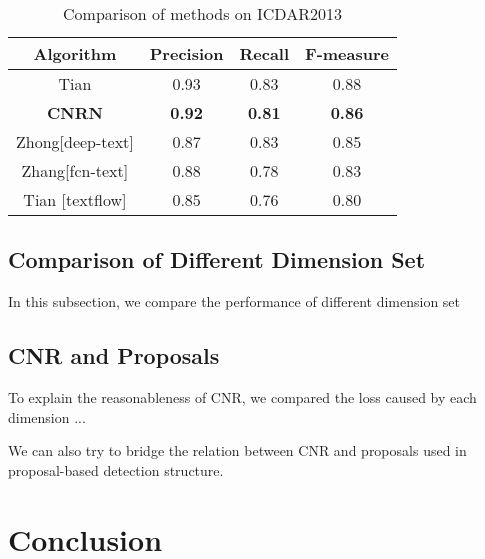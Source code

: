 \documentclass[10pt,twocolumn,letterpaper]{article}
\begin{document}
	\begin{table}
		\caption{Comparison of methods on ICDAR2013}
		\centering
		\begin{tabular}{|c|c|c|c|}
			\hline
			Algorithm & Precision & Recall & F-measure \\
			\hline
			\hline
			Tian & 0.93 & 0.83 & 0.88 \\
			\hline
			\textbf{CNRN} & \textbf{0.92} & \textbf{0.81} & \textbf{0.86} \\
			\hline
			Zhong[deep-text] & 0.87 & 0.83 & 0.85 \\ 
			\hline
			Zhang[fcn-text] & 0.88 & 0.78 & 0.83 \\ %
			\hline
			Tian [textflow] & 0.85 & 0.76 & 0.80 \\ %
			\hline
		\end{tabular}
	\end{table}	
	
	
	\subsection{Comparison of Different Dimension Set}
	In this subsection, we compare the performance of different dimension set
	
	\subsection{CNR and Proposals} %
	To explain the reasonableness of CNR, we compared the loss caused by each dimension ...
	
	We can also try to bridge the relation between CNR and proposals used in proposal-based detection structure. 
	
	
	


\section{Conclusion}







{\small


}
\end{document}
